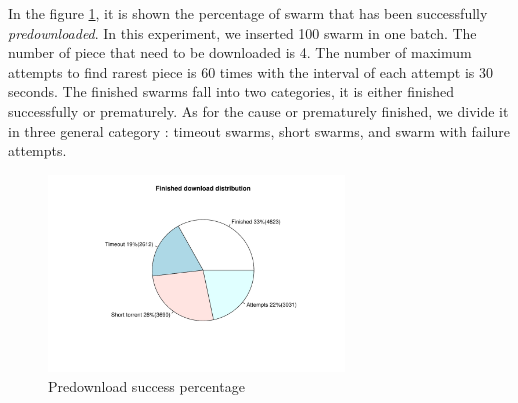 In the figure \ref{fig:predownprecent}, it is shown the percentage of swarm that has been successfully \textit{predownloaded}. In this experiment, we inserted 100 swarm in one batch. The number of piece that need to be downloaded is 4. The number of maximum attempts to find rarest piece is 60 times with the interval of each attempt is 30 seconds. The finished swarms fall into two categories, it is either finished successfully or prematurely. As for the cause or prematurely finished, we divide it in three general category : timeout swarms, short swarms, and swarm with failure attempts.

\begin{figure}[h]
	\centering
	\includegraphics[width=0.7\textwidth]{pics/results/dpredown_t60i30.pdf}
	\caption{Predownload success percentage}
	\label{fig:predownprecent}
\end{figure}


